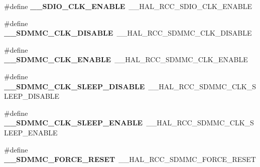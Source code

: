 \begin{DoxyCompactItemize}
\item 
\#define {\bfseries \+\_\+\+\_\+\+S\+D\+I\+O\+\_\+\+C\+L\+K\+\_\+\+E\+N\+A\+B\+LE}~\+\_\+\+\_\+\+H\+A\+L\+\_\+\+R\+C\+C\+\_\+\+S\+D\+I\+O\+\_\+\+C\+L\+K\+\_\+\+E\+N\+A\+B\+LE\hypertarget{group___h_a_l___r_c_c___aliased_ga49ae2415b1c5125e73624a4a1ca58daf}{}\label{group___h_a_l___r_c_c___aliased_ga49ae2415b1c5125e73624a4a1ca58daf}

\item 
\#define {\bfseries \+\_\+\+\_\+\+S\+D\+M\+M\+C\+\_\+\+C\+L\+K\+\_\+\+D\+I\+S\+A\+B\+LE}~\+\_\+\+\_\+\+H\+A\+L\+\_\+\+R\+C\+C\+\_\+\+S\+D\+M\+M\+C\+\_\+\+C\+L\+K\+\_\+\+D\+I\+S\+A\+B\+LE\hypertarget{group___h_a_l___r_c_c___aliased_gab78a805200c4766a0af323d852e73c34}{}\label{group___h_a_l___r_c_c___aliased_gab78a805200c4766a0af323d852e73c34}

\item 
\#define {\bfseries \+\_\+\+\_\+\+S\+D\+M\+M\+C\+\_\+\+C\+L\+K\+\_\+\+E\+N\+A\+B\+LE}~\+\_\+\+\_\+\+H\+A\+L\+\_\+\+R\+C\+C\+\_\+\+S\+D\+M\+M\+C\+\_\+\+C\+L\+K\+\_\+\+E\+N\+A\+B\+LE\hypertarget{group___h_a_l___r_c_c___aliased_gad592b2db4f3a4336e7083a5bbce52de0}{}\label{group___h_a_l___r_c_c___aliased_gad592b2db4f3a4336e7083a5bbce52de0}

\item 
\#define {\bfseries \+\_\+\+\_\+\+S\+D\+M\+M\+C\+\_\+\+C\+L\+K\+\_\+\+S\+L\+E\+E\+P\+\_\+\+D\+I\+S\+A\+B\+LE}~\+\_\+\+\_\+\+H\+A\+L\+\_\+\+R\+C\+C\+\_\+\+S\+D\+M\+M\+C\+\_\+\+C\+L\+K\+\_\+\+S\+L\+E\+E\+P\+\_\+\+D\+I\+S\+A\+B\+LE\hypertarget{group___h_a_l___r_c_c___aliased_ga3a7400ba40970d1010750ae7274d07a8}{}\label{group___h_a_l___r_c_c___aliased_ga3a7400ba40970d1010750ae7274d07a8}

\item 
\#define {\bfseries \+\_\+\+\_\+\+S\+D\+M\+M\+C\+\_\+\+C\+L\+K\+\_\+\+S\+L\+E\+E\+P\+\_\+\+E\+N\+A\+B\+LE}~\+\_\+\+\_\+\+H\+A\+L\+\_\+\+R\+C\+C\+\_\+\+S\+D\+M\+M\+C\+\_\+\+C\+L\+K\+\_\+\+S\+L\+E\+E\+P\+\_\+\+E\+N\+A\+B\+LE\hypertarget{group___h_a_l___r_c_c___aliased_ga874ca8e609a1707ee05251ea08cbcc02}{}\label{group___h_a_l___r_c_c___aliased_ga874ca8e609a1707ee05251ea08cbcc02}

\item 
\#define {\bfseries \+\_\+\+\_\+\+S\+D\+M\+M\+C\+\_\+\+F\+O\+R\+C\+E\+\_\+\+R\+E\+S\+ET}~\+\_\+\+\_\+\+H\+A\+L\+\_\+\+R\+C\+C\+\_\+\+S\+D\+M\+M\+C\+\_\+\+F\+O\+R\+C\+E\+\_\+\+R\+E\+S\+ET\hypertarget{group___h_a_l___r_c_c___aliased_ga7682a64b595f3acd375f5a3ad9be9372}{}\label{group___h_a_l___r_c_c___aliased_ga7682a64b595f3acd375f5a3ad9be9372}


\end{DoxyCompactItemize}
